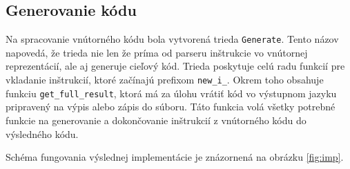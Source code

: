 \subsection{Generovanie kódu}
Na spracovanie vnútorného kódu bola vytvorená trieda \texttt{Generate}. Tento názov napovedá, že trieda nie len že príma od parseru inštrukcie vo vnútornej reprezentácií, ale aj generuje cieľový kód. Trieda poskytuje celú radu funkcií pre vkladanie inštrukcií, ktoré začínajú prefixom \texttt{new\_i\_}. Okrem toho obsahuje funkciu \texttt{get\_full\_result}, ktorá má za úlohu vrátiť kód vo výstupnom jazyku pripravený na výpis alebo zápis do súboru. Táto funkcia volá všetky potrebné funkcie na generovanie a dokončovanie inštrukcií z vnútorného kódu do výsledného kódu.

Schéma fungovania výslednej implementácie je znázornená na obrázku \ref{fig:imp}.

